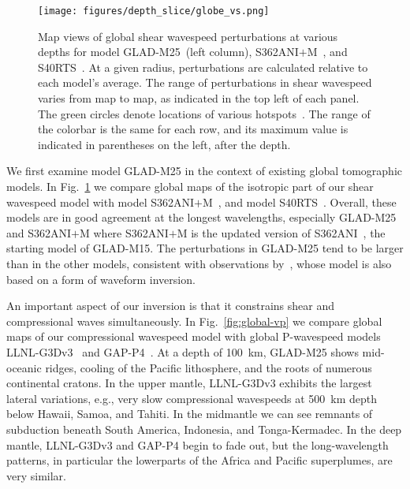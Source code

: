 \documentclass[extra,mreferee]{gji}
\begin{document}
\begin{figure}
  \centering
  \texttt{[image: figures/depth\_slice/globe\_vs.png]}
  \caption{\small{Map views of global shear wavespeed perturbations at various depths for  model
  GLAD-M25~(left column), S362ANI$+$M~\citep[middle column;][]{moulik2014anisotropic},
  and S40RTS~\citep[right column;][]{ritsema2011s40rts}.
  At a given radius,
  perturbations are calculated relative to each model's average.
  The range of perturbations in shear wavespeed varies from map to map, as indicated in the top left of each panel.
  The green circles denote locations of various
  hotspots~\citep{montelli2006catalogue}.
  The range of the colorbar is the same for each row,
  and its maximum value is indicated in parentheses on the left, after
  the depth.}}
  \label{fig:global-vs}
\end{figure}

We first examine model GLAD-M25 in the context of existing global tomographic models.
In Fig.~\ref{fig:global-vs} we compare global maps of the isotropic part of our
shear wavespeed model with model S362ANI$+$M~\citep{moulik2014anisotropic},
and model S40RTS~\citep{ritsema2011s40rts}.
Overall, these models are in good agreement
at the longest wavelengths, especially GLAD-M25 and S362ANI$+$M where S362ANI$+$M is the updated version of S362ANI~\citep{s362ani}, the starting model of GLAD-M15.
The perturbations in GLAD-M25 tend to be larger than in the other models,
consistent with observations by~\cite{french2014whole,french2015broad},
whose model is also based on a form of waveform inversion.


An important aspect of our inversion is that it constrains shear and
compressional waves simultaneously. In Fig.~\ref{fig:global-vp} we
compare global maps of our compressional wavespeed model with global P-wavespeed models
LLNL-G3Dv3~\citep{simmons2012llnl} and GAP-P4~\citep{fukao2013subducted}.
At a depth of 100~km,
GLAD-M25 shows mid-oceanic ridges, cooling of the Pacific lithosphere,
and the roots of numerous continental cratons. In the upper mantle, LLNL-G3Dv3
exhibits the largest lateral variations,
e.g., very slow compressional wavespeeds at 500~km depth below Hawaii, Samoa, and Tahiti.
In the midmantle we can see remnants of subduction beneath South America, Indonesia,
and Tonga-Kermadec.
In the deep mantle, LLNL-G3Dv3 and GAP-P4 begin to fade out, but the long-wavelength patterns,
in particular the lowerparts of the Africa and Pacific superplumes, are very similar.
\end{document}
